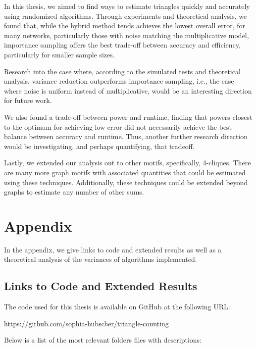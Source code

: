 \documentclass[11pt, margin=1in]{article}
\begin{document}
In this thesis, we aimed to find ways to estimate triangles quickly and accurately using randomized algorithms.
Through experiments and theoretical analysis, we found that, while the hybrid method tends achieves the lowest overall error, for many networks, particularly those with noise matching the multiplicative model, importance sampling offers the best trade-off between accuracy and efficiency, particularly for smaller sample sizes.

Research into the case where, according to the simulated tests and theoretical analysis, variance reduction outperforms importance sampling, i.e., the case where noise is uniform instead of multiplicative, would be an interesting direction for future work.

We also found a trade-off between power and runtime, finding that powers closest to the optimum for achieving low error did not necessarily achieve the best balance between accuracy and runtime.
Thus, another further research direction would be investigating, and perhaps quantifying, that tradeoff.

Lastly, we extended our analysis out to other motifs, specifically, 4-cliques.
There are many more graph motifs with associated quantities that could be estimated using these techniques.
Additionally, these techniques could be extended beyond graphs to estimate any number of other sums.

\newpage




\newpage

\section{Appendix}

In the appendix, we give links to code and extended results as well as a theoretical analysis of the variances of algorithms implemented.

\subsection{Links to Code and Extended Results}

The code used for this thesis is available on GitHub at the following URL:

\url{https://github.com/sophia-hubscher/triangle-counting}

Below is a list of the most relevant folders files with descriptions:
\end{document}
